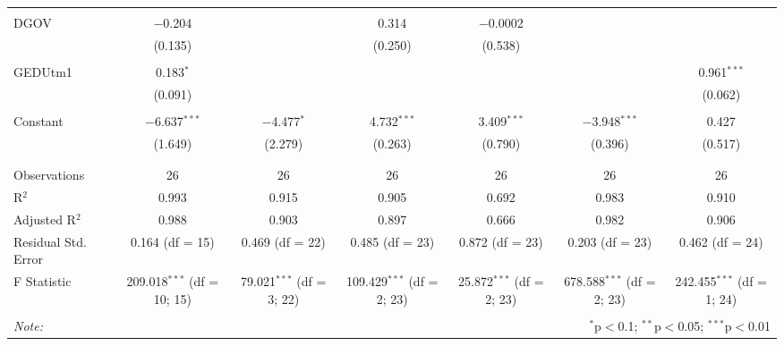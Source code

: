 \begin{table}[!htbp]
\begin{tabular}{@{\extracolsep{5pt}}lcccccc}
  & & & & & & \\ 
 DGOV & $-$0.204 &  & 0.314 & $-$0.0002 &  &  \\ 
  & (0.135) &  & (0.250) & (0.538) &  &  \\ 
  & & & & & & \\ 
 GEDUtm1 & 0.183$^{*}$ &  &  &  &  & 0.961$^{***}$ \\ 
  & (0.091) &  &  &  &  & (0.062) \\ 
  & & & & & & \\ 
 Constant & $-$6.637$^{***}$ & $-$4.477$^{*}$ & 4.732$^{***}$ & 3.409$^{***}$ & $-$3.948$^{***}$ & 0.427 \\ 
  & (1.649) & (2.279) & (0.263) & (0.790) & (0.396) & (0.517) \\ 
  & & & & & & \\ 
\hline \\[-1.8ex] 
Observations & 26 & 26 & 26 & 26 & 26 & 26 \\ 
R$^{2}$ & 0.993 & 0.915 & 0.905 & 0.692 & 0.983 & 0.910 \\ 
Adjusted R$^{2}$ & 0.988 & 0.903 & 0.897 & 0.666 & 0.982 & 0.906 \\ 
Residual Std. Error & 0.164 (df = 15) & 0.469 (df = 22) & 0.485 (df = 23) & 0.872 (df = 23) & 0.203 (df = 23) & 0.462 (df = 24) \\ 
F Statistic & 209.018$^{***}$ (df = 10; 15) & 79.021$^{***}$ (df = 3; 22) & 109.429$^{***}$ (df = 2; 23) & 25.872$^{***}$ (df = 2; 23) & 678.588$^{***}$ (df = 2; 23) & 242.455$^{***}$ (df = 1; 24) \\ 
\hline 
\hline \\[-1.8ex] 
\textit{Note:}  & \multicolumn{6}{r}{$^{*}$p$<$0.1; $^{**}$p$<$0.05; $^{***}$p$<$0.01} \\ 
\end{tabular} 
\end{table} 
